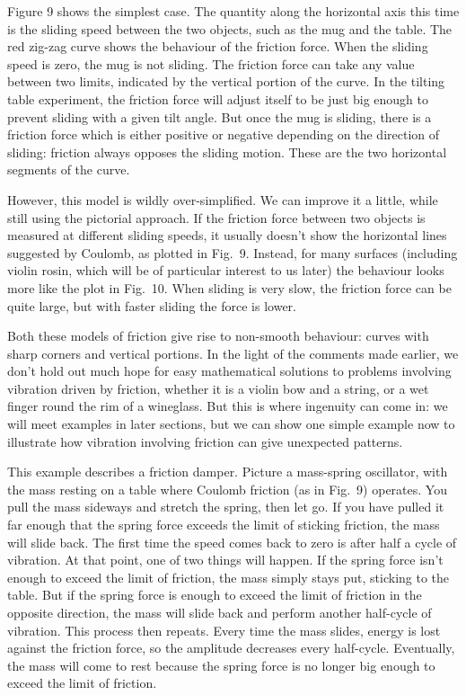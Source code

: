   Figure 9 shows the simplest case. The quantity along the horizontal axis this 
  time is the sliding speed between the two objects, such as the mug and the 
  table. The red zig-zag curve shows the behaviour of the friction force. When 
  the sliding speed is zero, the mug is not sliding. The friction force can 
  take any value between two limits, indicated by the vertical portion of the 
  curve. In the tilting table experiment, the friction force will adjust itself 
  to be just big enough to prevent sliding with a given tilt angle. But once 
  the mug is sliding, there is a friction force which is either positive or 
  negative depending on the direction of sliding: friction always opposes the 
  sliding motion. These are the two horizontal segments of the curve. 

  However, this model is wildly over-simplified. We can improve it a little, 
  while still using the pictorial approach. If the friction force between two 
  objects is measured at different sliding speeds, it usually doesn't show the 
  horizontal lines suggested by Coulomb, as plotted in Fig.\ 9. Instead, for 
  many surfaces (including violin rosin, which will be of particular interest 
  to us later) the behaviour looks more like the plot in Fig.\ 10. When sliding 
  is very slow, the friction force can be quite large, but with faster sliding 
  the force is lower. 

  Both these models of friction give rise to non-smooth behaviour: curves with 
  sharp corners and vertical portions. In the light of the comments made 
  earlier, we don't hold out much hope for easy mathematical solutions to 
  problems involving vibration driven by friction, whether it is a violin bow 
  and a string, or a wet finger round the rim of a wineglass. But this is where 
  ingenuity can come in: we will meet examples in later sections, but we can 
  show one simple example now to illustrate how vibration involving friction 
  can give unexpected patterns. 

  This example describes a friction damper. Picture a mass-spring oscillator, 
  with the mass resting on a table where Coulomb friction (as in Fig.\ 9) 
  operates. You pull the mass sideways and stretch the spring, then let go. If 
  you have pulled it far enough that the spring force exceeds the limit of 
  sticking friction, the mass will slide back. The first time the speed comes 
  back to zero is after half a cycle of vibration. At that point, one of two 
  things will happen. If the spring force isn't enough to exceed the limit of 
  friction, the mass simply stays put, sticking to the table. But if the spring 
  force is enough to exceed the limit of friction in the opposite direction, 
  the mass will slide back and perform another half-cycle of vibration. This 
  process then repeats. Every time the mass slides, energy is lost against the 
  friction force, so the amplitude decreases every half-cycle. Eventually, the 
  mass will come to rest because the spring force is no longer big enough to 
  exceed the limit of friction. 

